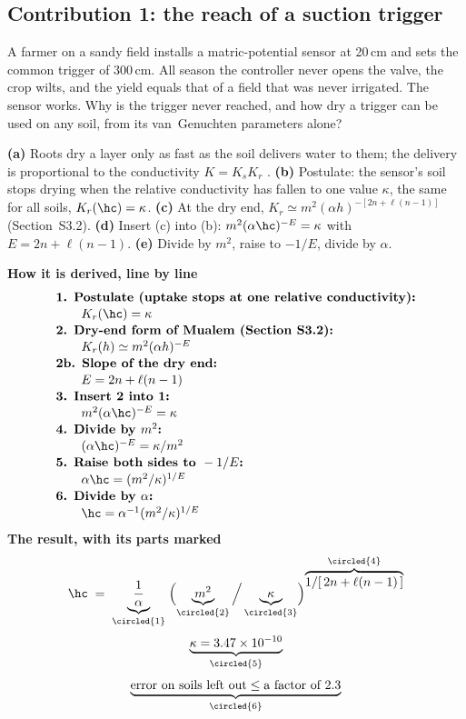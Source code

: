 \subsection{Contribution 1: the reach of a suction trigger}
\begin{problem}
A farmer on a sandy field installs a matric-potential sensor at 20\,cm and sets the common trigger of 300\,cm. All season the controller never opens the valve, the crop wilts, and the yield equals that of a field that was never irrigated. The sensor works. Why is the trigger never reached, and how dry a trigger can be used on any soil, from its van~Genuchten parameters alone?
\end{problem}
\begin{derivation}
\textbf{(a)} Roots dry a layer only as fast as the soil delivers water to them; the delivery is proportional to the conductivity $K=K_sK_r$ \citep{Gardner1960}. \textbf{(b)} Postulate: the sensor's soil stops drying when the relative conductivity has fallen to one value $\kappa$, the same for all soils, $K_r(\hc)=\kappa$. \textbf{(c)} At the dry end, $K_r\simeq m^2(\alpha h)^{-[2n+\ell(n-1)]}$ (Section~S3.2). \textbf{(d)} Insert (c) into (b): $m^2(\alpha\hc)^{-E}=\kappa$ with $E=2n+\ell(n-1)$. \textbf{(e)} Divide by $m^2$, raise to $-1/E$, divide by $\alpha$.
\end{derivation}
\begin{keyresult}
\begin{pencil}
{\small\noindent\textbf{How it is derived, line by line}
\[\begin{array}{@{}l@{}}\textbf{1. Postulate (uptake stops at one relative conductivity):}\\[1pt]
\qquad K_r(\hc)=\kappa\\[1pt]
\textbf{2. Dry-end form of Mualem (Section S3.2):}\\[1pt]
\qquad K_r(h)\simeq m^2(\alpha h)^{-E}\\[1pt]
\textbf{2b. Slope of the dry end:}\\[1pt]
\qquad E=2n+\ell(n-1)\\[1pt]
\textbf{3. Insert 2 into 1:}\\[1pt]
\qquad m^2(\alpha\hc)^{-E}=\kappa\\[1pt]
\textbf{4. Divide by } m^2\textbf{:}\\[1pt]
\qquad (\alpha\hc)^{-E}=\kappa/m^2\\[1pt]
\textbf{5. Raise both sides to } -1/E\textbf{:}\\[1pt]
\qquad \alpha\hc=(m^2/\kappa)^{1/E}\\[1pt]
\textbf{6. Divide by } \alpha\textbf{:}\\[1pt]
\qquad \hc=\alpha^{-1}(m^2/\kappa)^{1/E}
\end{array}\]}
\noindent\textbf{The result, with its parts marked}
\[
\hc\;=\;\underbrace{\frac{1}{\alpha}}_{\circled{1}}\;\Bigl(\underbrace{m^{2}}_{\circled{2}}\Big/\underbrace{\kappa}_{\circled{3}}\Bigr)^{\textstyle\overbrace{1/[\,2n+\ell(n-1)\,]}^{\circled{4}}}
\]
\[
\underbrace{\kappa=3.47\times10^{-10}}_{\circled{5}}\]
\[\underbrace{\text{error on soils left out}\le\text{a factor of }2.3}_{\circled{6}}
\]
\end{pencil}
\end{keyresult}
